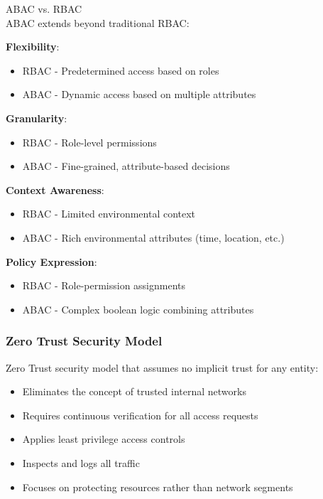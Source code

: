 \begin{concept}{ABAC vs. RBAC}\\
ABAC extends beyond traditional RBAC:

\textbf{Flexibility}:
    \begin{itemize}
        \item RBAC - Predetermined access based on roles
        \item ABAC - Dynamic access based on multiple attributes
    \end{itemize}

    \textbf{Granularity}:
    \begin{itemize}
        \item RBAC - Role-level permissions
        \item ABAC - Fine-grained, attribute-based decisions
    \end{itemize}

     \textbf{Context Awareness}:
    \begin{itemize}
        \item RBAC - Limited environmental context
        \item ABAC - Rich environmental attributes (time, location, etc.)
    \end{itemize}
\textbf{Policy Expression}:
    \begin{itemize}
        \item RBAC - Role-permission assignments
        \item ABAC - Complex boolean logic combining attributes
    \end{itemize}

\end{concept}


\multend


\subsubsection{Zero Trust Security Model}

\begin{definition}{Zero Trust} security model that assumes no implicit trust for any entity:
\begin{itemize}
    \item Eliminates the concept of trusted internal networks
    \item Requires continuous verification for all access requests
    \item Applies least privilege access controls
    \item Inspects and logs all traffic
    \item Focuses on protecting resources rather than network segments
\end{itemize}
\end{definition}

